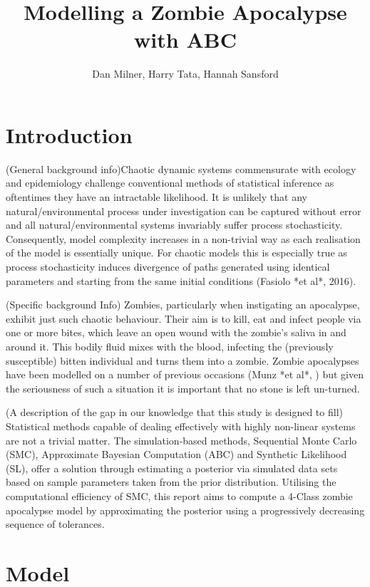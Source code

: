\documentclass[]{article}
\title{Modelling a Zombie Apocalypse with ABC}
\author{Dan Milner, Harry Tata, Hannah Sansford}
\begin{document}
\maketitle

\section{Introduction}

(General background info)Chaotic dynamic systems commensurate with ecology and epidemiology challenge conventional methods of statistical inference as oftentimes they have an intractable likelihood. It is unlikely that any natural/environmental process under investigation can be captured without error and all natural/environmental systems invariably suffer process stochasticity. Consequently, model complexity increases in a non-trivial way as each realisation of the model is essentially unique. For chaotic models this is especially true as process stochasticity induces divergence of paths generated using identical parameters and starting from the same initial conditions (Fasiolo *et al*, 2016).

(Specific background Info) Zombies, particularly when instigating an apocalypse, exhibit just such chaotic behaviour. Their aim is to kill, eat and infect people via one or more bites, which leave an open wound with the zombie's saliva in and around it. This bodily fluid mixes with the blood, infecting the (previously susceptible) bitten individual and turns them into a zombie. Zombie apocalypses have been modelled on a number of previous occasions (Munz *et al*, ) but given the seriousness of such a situation it is important that no stone is left un-turned. 

(A description of the gap in our knowledge that this study is designed to fill) Statistical methods capable of dealing effectively with highly non-linear systems are not a trivial matter. The simulation-based methods, Sequential Monte Carlo (SMC), Approximate Bayesian Computation (ABC) and Synthetic Likelihood (SL), offer a solution through estimating a posterior via simulated data sets based on sample parameters taken from the prior distribution. Utilising the computational efficiency of SMC, this report aims to compute a 4-Class zombie apocalypse model by approximating the posterior using a progressively decreasing sequence of tolerances. 


\section{Model}
\label{model}
\end{document}
